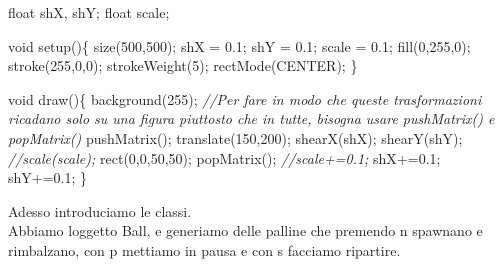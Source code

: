 \documentclass[
]{article}
\newenvironment{Shaded}{}{}
\newcommand{\CommentTok}[1]{\textcolor[rgb]{0.38,0.63,0.69}{\textit{#1}}}
\newcommand{\DataTypeTok}[1]{\textcolor[rgb]{0.56,0.13,0.00}{#1}}
\newcommand{\DecValTok}[1]{\textcolor[rgb]{0.25,0.63,0.44}{#1}}
\newcommand{\FloatTok}[1]{\textcolor[rgb]{0.25,0.63,0.44}{#1}}
\newcommand{\FunctionTok}[1]{\textcolor[rgb]{0.02,0.16,0.49}{#1}}
\newcommand{\NormalTok}[1]{#1}
\newcommand{\OperatorTok}[1]{\textcolor[rgb]{0.40,0.40,0.40}{#1}}
\begin{document}
\begin{Shaded}
\begin{Highlighting}[]
\DataTypeTok{float}\NormalTok{ shX}\OperatorTok{,}\NormalTok{ shY}\OperatorTok{;}
\DataTypeTok{float}\NormalTok{ scale}\OperatorTok{;}

\DataTypeTok{void} \FunctionTok{setup}\OperatorTok{()\{}
    \FunctionTok{size}\OperatorTok{(}\DecValTok{500}\OperatorTok{,}\DecValTok{500}\OperatorTok{);}
\NormalTok{    shX }\OperatorTok{=} \FloatTok{0.1}\OperatorTok{;}
\NormalTok{    shY }\OperatorTok{=} \FloatTok{0.1}\OperatorTok{;}
\NormalTok{    scale }\OperatorTok{=} \FloatTok{0.1}\OperatorTok{;}
    \FunctionTok{fill}\OperatorTok{(}\DecValTok{0}\OperatorTok{,}\DecValTok{255}\OperatorTok{,}\DecValTok{0}\OperatorTok{);}
    \FunctionTok{stroke}\OperatorTok{(}\DecValTok{255}\OperatorTok{,}\DecValTok{0}\OperatorTok{,}\DecValTok{0}\OperatorTok{);}
    \FunctionTok{strokeWeight}\OperatorTok{(}\DecValTok{5}\OperatorTok{);}
    \FunctionTok{rectMode}\OperatorTok{(}\NormalTok{CENTER}\OperatorTok{);}
\OperatorTok{\}}

\DataTypeTok{void} \FunctionTok{draw}\OperatorTok{()\{}
    \FunctionTok{background}\OperatorTok{(}\DecValTok{255}\OperatorTok{);}
    \CommentTok{//Per fare in modo che queste trasformazioni ricadano solo su una figura piuttosto che in tutte, bisogna usare pushMatrix() e popMatrix()}
    \FunctionTok{pushMatrix}\OperatorTok{();}
    \FunctionTok{translate}\OperatorTok{(}\DecValTok{150}\OperatorTok{,}\DecValTok{200}\OperatorTok{);}
    \FunctionTok{shearX}\OperatorTok{(}\NormalTok{shX}\OperatorTok{);}
    \FunctionTok{shearY}\OperatorTok{(}\NormalTok{shY}\OperatorTok{);}
    \CommentTok{//scale(scale);}
    \FunctionTok{rect}\OperatorTok{(}\DecValTok{0}\OperatorTok{,}\DecValTok{0}\OperatorTok{,}\DecValTok{50}\OperatorTok{,}\DecValTok{50}\OperatorTok{);}
    \FunctionTok{popMatrix}\OperatorTok{();}
    \CommentTok{//scale+=0.1;}
\NormalTok{    shX}\OperatorTok{+=}\FloatTok{0.1}\OperatorTok{;}
\NormalTok{    shY}\OperatorTok{+=}\FloatTok{0.1}\OperatorTok{;}
\OperatorTok{\}}
\end{Highlighting}
\end{Shaded}

Adesso introduciamo le classi.\\
Abbiamo l\textquotesingle oggetto Ball, e generiamo delle palline che
premendo n spawnano e rimbalzano, con p mettiamo in pausa e con s
facciamo ripartire.
\end{document}
